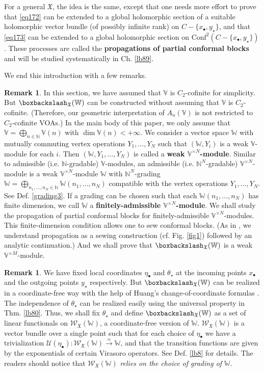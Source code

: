 \documentclass[11pt,b5paper,notitlepage]{article}
\theoremstyle{definition}
\newtheorem{rem}[df]{Remark}
\theoremstyle{plain}
\newcommand{\fk}{\mathfrak}
\newcommand{\mc}{\mathcal}
\newcommand{\Conf}{\mathrm{Conf}}
\newcommand{\scr}{\mathscr}
\newcommand{\blt}{\bullet}
\newcommand{\Vbb}{\mathbb V}
\newcommand{\Wbb}{\mathbb W}
\newcommand{\Nbb}{\mathbb N}
\newcommand{\<}{\left\langle}
\renewcommand{\>}{\right\rangle}
\newcommand{\fx}{\mathfrak{X}}
\newcommand{\bbs}{\boxbackslash}
\numberwithin{equation}{section}
\begin{document}
For a general $\fk X$, the idea is the same, except that one needs more effort to prove that \eqref{eq172} can be extended to a global holomorphic section of a suitable holomorphic vector bundle (of possibly infinite rank) on $C-\{x_\blt,y_\star\}$, and that \eqref{eq173} can be extended to a global holomorphic section on $\Conf^2(C-\{x_\blt,y_\star\})$. These processes are called the \textbf{propagations of partial conformal blocks} and will be studied systematically in Ch. \ref{lb89}.


We end this introduction with a few remarks.

\begin{rem}
In this section, we have assumed that $\Vbb$ is $C_2$-cofinite for simplicity. But $\bbs_\fx(\Wbb)$ can be constructed without assuming that $\Vbb$ is $C_2$-cofinite. (Therefore, our geometric interpretation of $A_n(\Vbb)$ is not restricted to $C_2$-cofinite VOAs.) In the main body of this paper, we only assume that $\Vbb=\bigoplus_{n\in\Nbb}\Vbb(n)$ with $\dim \Vbb(n)<+\infty$. We consider a vector space $\Wbb$ with mutually commuting vertex operations $Y_1,\dots,Y_N$ such that $(\Wbb,Y_i)$ is a weak $\Vbb$-module for each $i$. Then $(\Wbb, Y_1,\dots,Y_N)$ is called a \textbf{weak $\Vbb^{\times N}$-module}. Similar to admissible (i.e. $\Nbb$-gradable) $\Vbb$-modules, an admissible (i.e. $\Nbb^N$-gradable) $\Vbb^{\times N}$-module is a weak $\Vbb^{\times N}$-module $\Wbb$ with $\Nbb^N$-grading $\Wbb=\bigoplus_{n_1,\dots,n_N\in\Nbb}\Wbb(n_1,\dots,n_N)$ compatible with the vertex operations $Y_1,\dots,Y_N$. See Def. \ref{grading3}. If a grading can be chosen such that each $\Wbb(n_1,\dots,n_N)$ has finite dimension, we call $\Wbb$ a \textbf{finitely-admissible $\Vbb^{\times N}$-module}. We shall study the propagation of partial conformal blocks for finitely-admissible $\Vbb^{\times N}$-modules. This finite-dimension condition allows one to sew conformal blocks. (As in \cite{Gui-propagation}, we understand propagation as a sewing construction (cf. Fig. \ref{fig1}) followed by an analytic continuation.) And we shall prove that $\bbs_\fx(\Wbb)$ is a weak $\Vbb^{\times M}$-module. 
\end{rem}

\begin{rem}
We have fixed local coordinates $\eta_\blt$ and $\theta_\star$ at the incoming points $x_\blt$ and the outgoing points $y_\star$ respectively. But $\bbs_\fx(\Wbb)$ can be realized in a coordinate-free way with the help of Huang's change-of-coordinate formulas \cite{Hua97}. The independence of $\theta_\star$ can be realized easily using the universal property in Thm. \ref{lb80}. Thus, we shall fix $\theta_\star$ and define $\bbs_\fx(\Wbb)$ as a set of linear functionals on $\scr W_\fx(\Wbb)$, a coordinate-free version of $\Wbb$. $\scr W_\fx(\Wbb)$ is a vector bundle over a single point such that for each choice of $\eta_\blt$ we have a trivialization $\mc U(\eta_\blt):\scr W_\fx(\Wbb)\xrightarrow{\simeq}\Wbb$, and that the transition functions are given by the exponentials of certain Virasoro operators. See Def. \ref{lb8} for details. The readers should notice that $\scr W_\fx(\Wbb)$ \emph{relies on the choice of grading of $\Wbb$}.
\end{rem}
\end{document}
